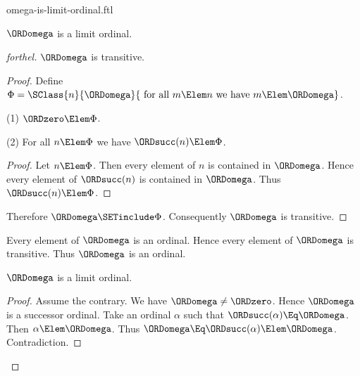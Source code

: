 \documentclass{stex}
\begin{document}
\begin{smodule}{omega-is-limit-ordinal.ftl}

\begin{proposition}[forthel,id=SET_THEORY_03_764451995254784]
  $\ORDomega$ is a limit ordinal.
\end{proposition}
\begin{proof}[forthel]
  $\ORDomega$ is transitive.
  \begin{proof}
    Define $\Phi = \SClass{n}{\ORDomega}{\text{ for all }m \Elem n\text{ we have }m \Elem \ORDomega}$.

    (1) $\ORDzero \Elem \Phi$.

    (2) For all $n \Elem \Phi$ we have $\ORDsucc(n) \Elem \Phi$.
    \begin{proof}
      Let $n \Elem \Phi$.
      Then every element of $n$ is contained in $\ORDomega$.
      Hence every element of $\ORDsucc(n)$ is contained in $\ORDomega$.
      Thus $\ORDsucc(n) \Elem \Phi$.
    \end{proof}

    Therefore $\ORDomega \SETinclude \Phi$.
    Consequently $\ORDomega$ is transitive.
  \end{proof}

  Every element of $\ORDomega$ is an ordinal.
  Hence every element of $\ORDomega$ is transitive.
  Thus $\ORDomega$ is an ordinal.

  $\ORDomega$ is a limit ordinal.
  \begin{proof}
    Assume the contrary.
    We have $\ORDomega \neq \ORDzero$.
    Hence $\ORDomega$ is a successor ordinal.
    Take an ordinal $\alpha$ such that $\ORDsucc(\alpha) \Eq \ORDomega$.
    Then $\alpha \Elem \ORDomega$.
    Thus $\ORDomega \Eq \ORDsucc(\alpha) \Elem \ORDomega$.
    Contradiction.
  \end{proof}
\end{proof}
\end{smodule}
\end{document}
